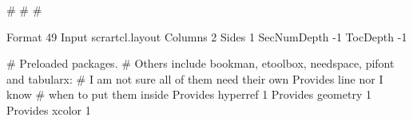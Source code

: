 #%
#  
#  

Format 49
Input scrartcl.layout
Columns		2
Sides		1
SecNumDepth	-1
TocDepth	-1

# Preloaded packages.
# Others include bookman, etoolbox, needspace, pifont and tabularx:
# I am not sure all of them need their own Provides line nor I know
# when to put them inside \DeclareLaTeXClass
Provides hyperref 1
Provides geometry 1
Provides xcolor   1